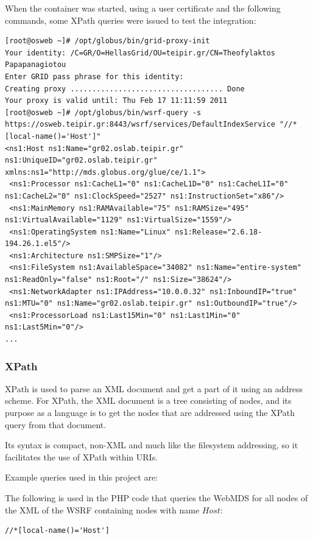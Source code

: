 When the container was started, using a user certificate and the following commands, some XPath queries were issued to test the integration:
 
\begin{lstlisting}[caption=WSRF command line query]
[root@osweb ~]# /opt/globus/bin/grid-proxy-init
Your identity: /C=GR/O=HellasGrid/OU=teipir.gr/CN=Theofylaktos Papapanagiotou
Enter GRID pass phrase for this identity:
Creating proxy ................................... Done
Your proxy is valid until: Thu Feb 17 11:11:59 2011
[root@osweb ~]# /opt/globus/bin/wsrf-query -s https://osweb.teipir.gr:8443/wsrf/services/DefaultIndexService "//*[local-name()='Host']"
<ns1:Host ns1:Name="gr02.oslab.teipir.gr" ns1:UniqueID="gr02.oslab.teipir.gr" xmlns:ns1="http://mds.globus.org/glue/ce/1.1">
 <ns1:Processor ns1:CacheL1="0" ns1:CacheL1D="0" ns1:CacheL1I="0" ns1:CacheL2="0" ns1:ClockSpeed="2527" ns1:InstructionSet="x86"/>
 <ns1:MainMemory ns1:RAMAvailable="75" ns1:RAMSize="495" ns1:VirtualAvailable="1129" ns1:VirtualSize="1559"/>
 <ns1:OperatingSystem ns1:Name="Linux" ns1:Release="2.6.18-194.26.1.el5"/>
 <ns1:Architecture ns1:SMPSize="1"/>
 <ns1:FileSystem ns1:AvailableSpace="34082" ns1:Name="entire-system" ns1:ReadOnly="false" ns1:Root="/" ns1:Size="38624"/>
 <ns1:NetworkAdapter ns1:IPAddress="10.0.0.32" ns1:InboundIP="true" ns1:MTU="0" ns1:Name="gr02.oslab.teipir.gr" ns1:OutboundIP="true"/>
 <ns1:ProcessorLoad ns1:Last15Min="0" ns1:Last1Min="0" ns1:Last5Min="0"/>
...
\end{lstlisting}

\subsubsection{XPath}

XPath is used to parse an XML document and get a part of it using an address scheme. For XPath, the XML document is a tree consisting of nodes, and its purpose as a language is to get the nodes that are addressed using the XPath query from that document.

Its syntax is compact, non-XML and much like the filesystem addressing, so it facilitates the use of XPath within URIs.

Example queries used in this project are:

The following is used in the PHP code that queries the WebMDS for all nodes of the XML of the WSRF containing nodes with name $Host$:
\begin{lstlisting}
//*[local-name()='Host']
\end{lstlisting}


